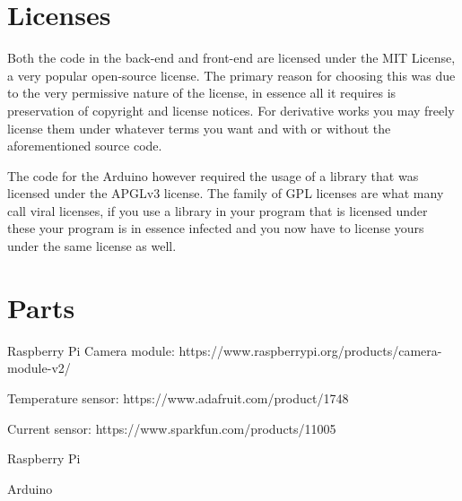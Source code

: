 \documentclass[12pt,a4paper,oneside,article]{memoir}
\numberwithin{equation}{chapter}
\begin{document}
\clearpage
\appendix
\chapter{Licenses}\label{sec:licenses}
Both the code in the back-end and front-end are licensed under the MIT License,
a very popular open-source license. The primary reason for choosing this was due
to the very permissive nature of the license, in essence all it requires is
preservation of copyright and license notices. For derivative works you may
freely license them under whatever terms you want and with or without the
aforementioned source code.

The code for the Arduino however required the usage of a library that was
licensed under the APGLv3 license. The family of GPL licenses are what many call
viral licenses, if you use a library in your program that is licensed under
these your program is in essence infected and you now have to license yours
under the same license as well.

\chapter{Parts}\label{sec:parts}
Raspberry Pi Camera module: 
https://www.raspberrypi.org/products/camera-module-v2/

Temperature sensor: https://www.adafruit.com/product/1748

Current sensor: https://www.sparkfun.com/products/11005

Raspberry Pi

Arduino

\clearpage{}
\renewcommand*{\UrlFont}{\footnotesize\ttfamily}
\printbibliography{}
\end{document}
